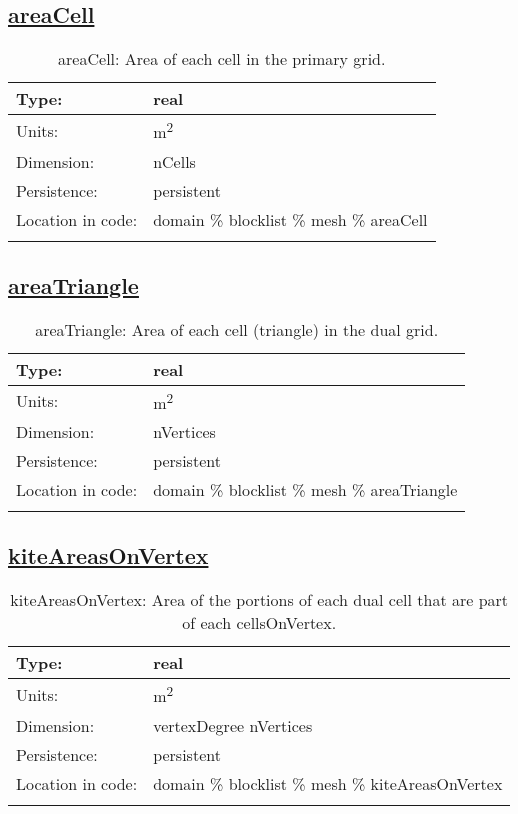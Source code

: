 \subsection[areaCell]{\hyperref[sec:var_tab_mesh]{areaCell}}
\label{subsec:var_sec_mesh_areaCell}
\begin{center}
\begin{longtable}{| p{2.0in} | p{4.0in} |}
        \hline 
        Type: & real \\
        \hline 
        Units: & \si{m^2} \\
        \hline 
        Dimension: & nCells \\
        \hline 
        Persistence: & persistent \\
        \hline 
         Location in code: & domain \% blocklist \% mesh \% areaCell \\
         \hline 
    \caption{areaCell: Area of each cell in the primary grid.}
\end{longtable}
\end{center}
\subsection[areaTriangle]{\hyperref[sec:var_tab_mesh]{areaTriangle}}
\label{subsec:var_sec_mesh_areaTriangle}
\begin{center}
\begin{longtable}{| p{2.0in} | p{4.0in} |}
        \hline 
        Type: & real \\
        \hline 
        Units: & \si{m^2} \\
        \hline 
        Dimension: & nVertices \\
        \hline 
        Persistence: & persistent \\
        \hline 
         Location in code: & domain \% blocklist \% mesh \% areaTriangle \\
         \hline 
    \caption{areaTriangle: Area of each cell (triangle) in the dual grid.}
\end{longtable}
\end{center}
\subsection[kiteAreasOnVertex]{\hyperref[sec:var_tab_mesh]{kiteAreasOnVertex}}
\label{subsec:var_sec_mesh_kiteAreasOnVertex}
\begin{center}
\begin{longtable}{| p{2.0in} | p{4.0in} |}
        \hline 
        Type: & real \\
        \hline 
        Units: & \si{m^2} \\
        \hline 
        Dimension: & vertexDegree nVertices \\
        \hline 
        Persistence: & persistent \\
        \hline 
         Location in code: & domain \% blocklist \% mesh \% kiteAreasOnVertex \\
         \hline 
    \caption{kiteAreasOnVertex: Area of the portions of each dual cell that are part of each cellsOnVertex.}
\end{longtable}
\end{center}
